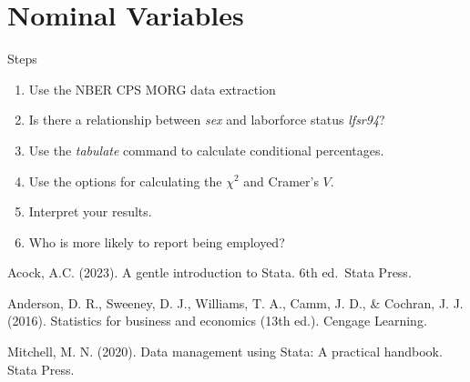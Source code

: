\documentclass[
]{book}
\providecommand{\tightlist}{%
  \setlength{\itemsep}{0pt}\setlength{\parskip}{0pt}}
\begin{document}
\section{Nominal Variables}\label{nominal-variables}

Steps

\begin{enumerate}
\def\labelenumi{\arabic{enumi}.}
\tightlist
\item
  Use the NBER CPS MORG data extraction
\item
  Is there a relationship between \emph{sex} and laborforce status \emph{lfsr94}?
\item
  Use the \emph{tabulate} command to calculate conditional percentages.
\item
  Use the options for calculating the \(\chi^2\) and Cramer's \(V\).
\item
  Interpret your results.
\item
  Who is more likely to report being employed?
\end{enumerate}

Acock, A.C. (2023). A gentle introduction to Stata. 6th ed.~Stata Press.

Anderson, D. R., Sweeney, D. J., Williams, T. A., Camm, J. D., \& Cochran, J. J. (2016). Statistics for business and economics (13th ed.). Cengage Learning.

Mitchell, M. N. (2020). Data management using Stata: A practical handbook. Stata Press.


\end{document}
